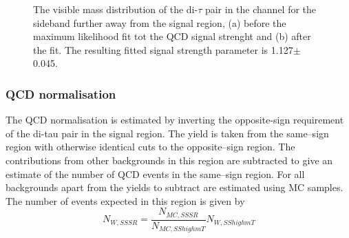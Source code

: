 \begin{figure}[h!]
\begin{center}
\end{center}
\caption{The visible mass distribution of the di-$\tau$ pair in the \etau channel for the sideband further away from the signal region, (a) before
the maximum likelihood fit tot the QCD signal strenght and (b) after the fit. The resulting fitted signal strength parameter
is 1.127$\pm$0.045.}
\label{fig:mssm_qcdossss_etfar}
\end{figure}




\subsubsection{QCD normalisation}
\label{sec:mssm_bkgs_etmt_qcdnorm}
The QCD normalisation is estimated by inverting the opposite-sign requirement
of the di-tau pair in the signal region. The yield is taken from the same--sign
region with otherwise identical cuts to the opposite--sign region. The contributions
from other backgrounds in this region are subtracted to give an estimate of the number
of QCD events in the same--sign region. For all backgrounds apart from \Wjets the
yields to subtract are estimated using \ac{MC} samples. The number of \Wjets events
expected in this region is given by
\begin{equation}\label{eqn:wjets_qcdsub}
N_{W,SS SR} = \frac{N_{MC,SS SR}}{N_{MC,SS high mT}}N_{W,SS high mT}
\end{equation}

